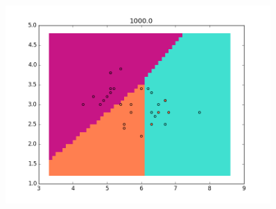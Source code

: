\documentclass{article}
\begin{document}
\begin{center}
\begin{figure}
\centering
\includegraphics[width=0.9\textwidth]{figure_7}
\caption{}
\label{fig:4}
\end{figure}
\end{center}
\end{document}
